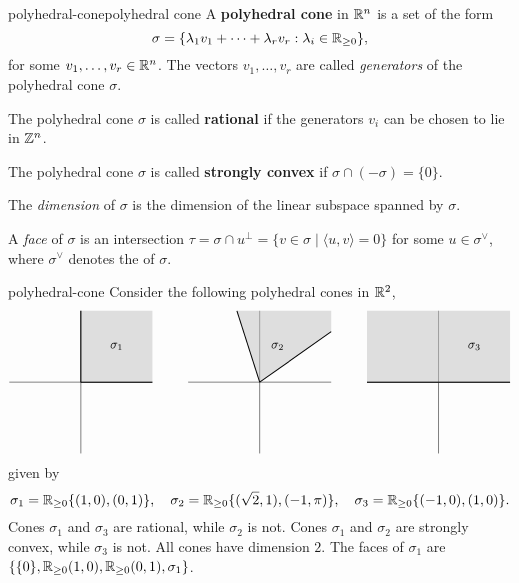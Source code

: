 \begin{topic}{polyhedral-cone}{polyhedral cone}
    A \textbf{polyhedral cone} in $\mathbb{R}^n$ is a set of the form
    \[ \sigma = \{ \lambda_1 v_1 + \cdots + \lambda_r v_r : \lambda_i \in \mathbb{R}_{\ge 0} \} , \]
    for some $v_1, \ldots, v_r \in \mathbb{R}^n$. The vectors $v_1, \ldots, v_r$ are called \textit{generators} of the polyhedral cone $\sigma$.
    
    The polyhedral cone $\sigma$ is called \textbf{rational} if the generators $v_i$ can be chosen to lie in $\mathbb{Z}^n$.
    
    The polyhedral cone $\sigma$ is called \textbf{strongly convex} if $\sigma \cap (-\sigma) = \{ 0 \}$.
    
    The \textit{dimension} of $\sigma$ is the dimension of the linear subspace spanned by $\sigma$.
    
    A \textit{face} of $\sigma$ is an intersection $\tau = \sigma \cap u^\perp = \{ v \in \sigma \mid \langle u, v \rangle = 0 \}$ for some $u \in \sigma^\vee$, where $\sigma^\vee$ denotes the  of $\sigma$.
\end{topic}

\begin{example}{polyhedral-cone}
    Consider the following polyhedral cones in $\mathbb{R}^2$,
    \[ \begin{tikzpicture}
        \begin{scope}[shift={(-5,0)}]
            \draw (-2, 0) -- (2, 0);
            \draw (0, -2) -- (0, 2);
            \fill[fill=gray!50, opacity=0.5] (0, 0) -- (0, 2) -- (2, 2) -- (2, 0);
            \draw[thick] (0, 0) -- (2, 0);
            \draw[thick] (0, 0) -- (0, 2);
            \node at (1, 1) {$\sigma_1$};
        \end{scope}
        \begin{scope}
            \draw (-2, 0) -- (2, 0);
            \draw (0, -2) -- (0, 2);
            \fill[fill=gray!50, opacity=0.5] (0, 0) -- (2, 1.4142135) -- (2, 2) -- (-0.63661977, 2);
            \draw[thick] (0, 0) -- (2, 1.4142135);
            \draw[thick] (0, 0) -- (-0.63661977, 2);
            \node at (0.5, 1) {$\sigma_2$};
        \end{scope}
        \begin{scope}[shift={(5,0)}]
            \draw (-2, 0) -- (2, 0);
            \draw (0, -2) -- (0, 2);
            \fill[fill=gray!50, opacity=0.5] (-2, 0) -- (2, 0) -- (2, 2) -- (-2, 2);
            \draw[thick] (0, 0) -- (2, 0);
            \draw[thick] (0, 0) -- (-2, 0);
            \node at (1, 1) {$\sigma_3$};
        \end{scope}
    \end{tikzpicture} \]
    given by
    \[ \sigma_1 = \mathbb{R}_{\ge 0} \{ (1, 0), (0, 1) \}, \quad \sigma_2 = \mathbb{R}_{\ge 0} \{ (\sqrt{2}, 1), (-1, \pi) \}, \quad \sigma_3 = \mathbb{R}_{\ge 0} \{ (-1, 0), (1, 0) \} .  \]
    Cones $\sigma_1$ and $\sigma_3$ are rational, while $\sigma_2$ is not. Cones $\sigma_1$ and $\sigma_2$ are strongly convex, while $\sigma_3$ is not. All cones have dimension $2$. The faces of $\sigma_1$ are $\{ \{ 0 \}, \mathbb{R}_{\ge 0} (1, 0), \mathbb{R}_{\ge 0} (0, 1), \sigma_1 \}$.
\end{example}

